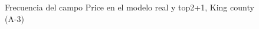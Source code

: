 \begin{figure}[H]
    \centering
    
    \caption{Frecuencia del campo Price en el modelo real y top2+1, King county (A-3)}
    \label{frecuency-top2+1-price}
\end{figure}